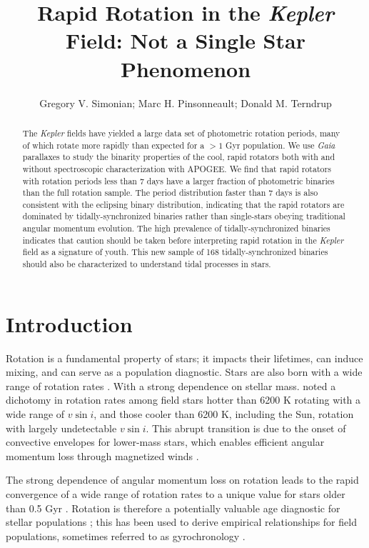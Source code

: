 \documentclass[manuscript]{aastex6}
\newcommand{\vsini}{\ensuremath{v \sin i}}
\newcommand{\Kepler}{\mbox{\textit{Kepler}}}
\newcommand{\Gaia}{\mbox{\textit{Gaia}}}
\begin{document}
\title{Rapid Rotation in the \Kepler{} Field: Not a Single Star
Phenomenon}
\author{Gregory V. Simonian; Marc H. Pinsonneault; Donald M. Terndrup}

\begin{abstract}
    The \Kepler{} fields have yielded a large data set of photometric rotation
    periods, many of which rotate more rapidly than expected for a \(> 1\) Gyr
    population. We use \Gaia{} parallaxes to study the binarity properties of
    the cool, rapid rotators both with and without spectroscopic
    characterization with APOGEE\@. We find that rapid rotators with rotation
    periods less than 7 days have a larger fraction of photometric binaries
    than the full rotation sample. The period distribution faster than 7 days
    is also consistent with the eclipsing binary distribution, indicating that
    the rapid rotators are dominated by tidally-synchronized binaries rather
    than single-stars obeying traditional angular momentum evolution. The high
    prevalence of tidally-synchronized binaries indicates that caution should
    be taken before interpreting rapid rotation in the \Kepler{} field as a
    signature of youth. This new sample of 168 tidally-synchronized binaries
    should also be characterized to understand tidal processes in stars.
\end{abstract}

\section{Introduction}

Rotation is a fundamental property of stars; it impacts their lifetimes, can
induce mixing, and can serve as a population diagnostic. Stars are also born 
with a wide range of rotation rates \citep{Attridge92, Herbst00, Henderson12}.
With a strong dependence on stellar mass. \citet{Kraft67} noted a dichotomy in
rotation rates among field stars hotter than 6200 K rotating with a wide range
of \vsini, and those cooler than 6200 K, including the Sun, rotation with
largely undetectable \vsini. This abrupt transition is due to the onset of
convective envelopes for lower-mass stars, which enables efficient angular
momentum loss through magnetized winds \citep{Parker58,Weber67}.

The strong dependence of angular momentum loss on rotation \citep{Kawaler88}
leads to the rapid convergence of a wide range of rotation rates to a unique
value for stars older than 0.5 Gyr \citep{Pinsonneault89}. Rotation is
therefore a potentially valuable age diagnostic for stellar populations
\citep{Skumanich72}; this has been used to derive empirical relationships for
field populations, sometimes referred to as gyrochronology \citep{Barnes07,
Mamajek08, Meibom09}.  
\end{document}
